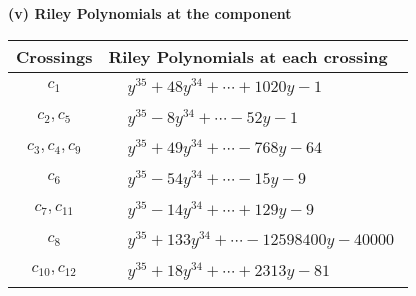 \documentclass[1p]{elsarticle_modified}
\theoremstyle{definition}
\begin{document}
\flushleft \textbf{(v) Riley Polynomials at the component}\newline \\
\begin{tabular}{m{50pt}|m{274pt}}
Crossings & \hspace{64pt}Riley Polynomials at each crossing \\
\hline $$\begin{aligned}c_{1}\end{aligned}$$&$\begin{aligned}
&y^{35}+48 y^{34}+\cdots+1020 y-1
\end{aligned}$\\
\hline $$\begin{aligned}c_{2},c_{5}\end{aligned}$$&$\begin{aligned}
&y^{35}-8 y^{34}+\cdots-52 y-1
\end{aligned}$\\
\hline $$\begin{aligned}c_{3},c_{4},c_{9}\end{aligned}$$&$\begin{aligned}
&y^{35}+49 y^{34}+\cdots-768 y-64
\end{aligned}$\\
\hline $$\begin{aligned}c_{6}\end{aligned}$$&$\begin{aligned}
&y^{35}-54 y^{34}+\cdots-15 y-9
\end{aligned}$\\
\hline $$\begin{aligned}c_{7},c_{11}\end{aligned}$$&$\begin{aligned}
&y^{35}-14 y^{34}+\cdots+129 y-9
\end{aligned}$\\
\hline $$\begin{aligned}c_{8}\end{aligned}$$&$\begin{aligned}
&y^{35}+133 y^{34}+\cdots-12598400 y-40000
\end{aligned}$\\
\hline $$\begin{aligned}c_{10},c_{12}\end{aligned}$$&$\begin{aligned}
&y^{35}+18 y^{34}+\cdots+2313 y-81
\end{aligned}$\\
\hline
\end{tabular}\\~\\
\end{document}
